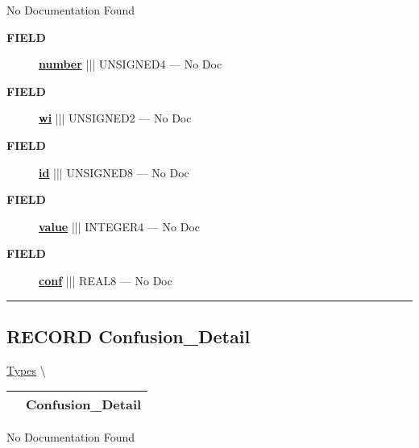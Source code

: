 \par





No Documentation Found







\par
\begin{description}
\item [\colorbox{tagtype}{\color{white} \textbf{\textsf{FIELD}}}] \textbf{\underline{number}} ||| UNSIGNED4 --- No Doc
\item [\colorbox{tagtype}{\color{white} \textbf{\textsf{FIELD}}}] \textbf{\underline{wi}} ||| UNSIGNED2 --- No Doc
\item [\colorbox{tagtype}{\color{white} \textbf{\textsf{FIELD}}}] \textbf{\underline{id}} ||| UNSIGNED8 --- No Doc
\item [\colorbox{tagtype}{\color{white} \textbf{\textsf{FIELD}}}] \textbf{\underline{value}} ||| INTEGER4 --- No Doc
\item [\colorbox{tagtype}{\color{white} \textbf{\textsf{FIELD}}}] \textbf{\underline{conf}} ||| REAL8 --- No Doc
\end{description}





\rule{\linewidth}{0.5pt}
\subsection*{\textsf{\colorbox{headtoc}{\color{white} RECORD}
Confusion\_Detail}}

\hypertarget{ecldoc:ml_core.types.confusion_detail}{}
\hspace{0pt} \hyperlink{ecldoc:ML_Core.Types}{Types} \textbackslash 

{\renewcommand{\arraystretch}{1.5}
\begin{tabularx}{\textwidth}{|>{\raggedright\arraybackslash}l|X|}
\hline
\hspace{0pt}\mytexttt{\color{red} } & \textbf{Confusion\_Detail} \\
\hline
\end{tabularx}
}

\par





No Documentation Found







